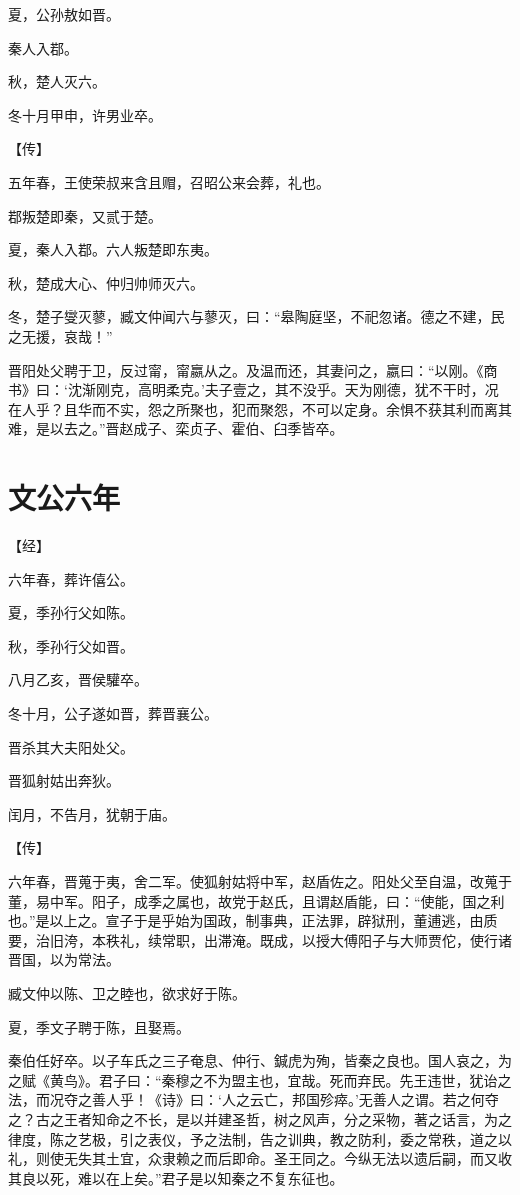 \documentclass[a4paper,12pt,UTF8,twoside]{ctexbook}
\begin{document}
夏，公孙敖如晋。

秦人入鄀。

秋，楚人灭六。

冬十月甲申，许男业卒。

【传】

五年春，王使荣叔来含且赗，召昭公来会葬，礼也。

鄀叛楚即秦，又贰于楚。

夏，秦人入鄀。六人叛楚即东夷。

秋，楚成大心、仲归帅师灭六。

冬，楚子燮灭蓼，臧文仲闻六与蓼灭，曰：“皋陶庭坚，不祀忽诸。德之不建，民之无援，哀哉！”

晋阳处父聘于卫，反过甯，甯嬴从之。及温而还，其妻问之，嬴曰：“以刚。《商书》曰：‘沈渐刚克，高明柔克。’夫子壹之，其不没乎。天为刚德，犹不干时，况在人乎？且华而不实，怨之所聚也，犯而聚怨，不可以定身。余惧不获其利而离其难，是以去之。”晋赵成子、栾贞子、霍伯、臼季皆卒。


\chapter{文公六年}



【经】

六年春，葬许僖公。

夏，季孙行父如陈。

秋，季孙行父如晋。

八月乙亥，晋侯驩卒。

冬十月，公子遂如晋，葬晋襄公。

晋杀其大夫阳处父。

晋狐射姑出奔狄。

闰月，不告月，犹朝于庙。

【传】

六年春，晋蒐于夷，舍二军。使狐射姑将中军，赵盾佐之。阳处父至自温，改蒐于董，易中军。阳子，成季之属也，故党于赵氏，且谓赵盾能，曰：“使能，国之利也。”是以上之。宣子于是乎始为国政，制事典，正法罪，辟狱刑，董逋逃，由质要，治旧洿，本秩礼，续常职，出滞淹。既成，以授大傅阳子与大师贾佗，使行诸晋国，以为常法。

臧文仲以陈、卫之睦也，欲求好于陈。

夏，季文子聘于陈，且娶焉。

秦伯任好卒。以子车氏之三子奄息、仲行、鍼虎为殉，皆秦之良也。国人哀之，为之赋《黄鸟》。君子曰：“秦穆之不为盟主也，宜哉。死而弃民。先王违世，犹诒之法，而况夺之善人乎！《诗》曰：‘人之云亡，邦国殄瘁。’无善人之谓。若之何夺之？古之王者知命之不长，是以并建圣哲，树之风声，分之采物，著之话言，为之律度，陈之艺极，引之表仪，予之法制，告之训典，教之防利，委之常秩，道之以礼，则使无失其土宜，众隶赖之而后即命。圣王同之。今纵无法以遗后嗣，而又收其良以死，难以在上矣。”君子是以知秦之不复东征也。
\end{document}
